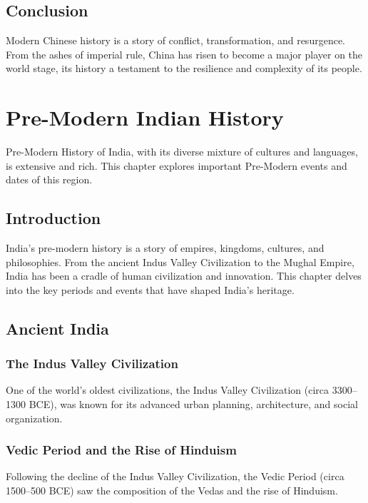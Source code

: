 \documentclass{book}
\begin{document}
\section{Conclusion}
\label{sec:conclusion}
Modern Chinese history is a story of conflict, transformation, and resurgence. From the ashes of imperial rule, China has risen to become a major player on the world stage, its history a testament to the resilience and complexity of its people.

\chapter{Pre-Modern Indian History}
\label{ch:pre-modern-indian-history}

Pre-Modern History of India, with its diverse mixture of cultures and languages, is extensive and rich. This chapter explores important Pre-Modern events and dates of this region.

\section{Introduction}
\label{sec:introduction-pre-modern-india}
India's pre-modern history is a story of empires, kingdoms, cultures, and philosophies. From the ancient Indus Valley Civilization to the Mughal Empire, India has been a cradle of human civilization and innovation. This chapter delves into the key periods and events that have shaped India’s heritage.

\section{Ancient India}
\label{sec:ancient-india}

\subsection{The Indus Valley Civilization}
One of the world’s oldest civilizations, the Indus Valley Civilization (circa 3300–1300 BCE), was known for its advanced urban planning, architecture, and social organization.

\subsection{Vedic Period and the Rise of Hinduism}
Following the decline of the Indus Valley Civilization, the Vedic Period (circa 1500–500 BCE) saw the composition of the Vedas and the rise of Hinduism.
\end{document}

